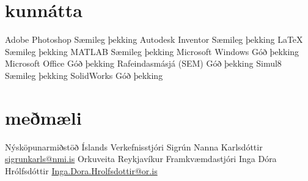 \documentclass[]{friggeri-cv}
\begin{document}

\section{kunnátta}

\begin{entrylist}
  \entry
    {Adobe Photoshop}
    {Sæmileg þekking}
    {}
    {}
  \entry
    {Autodesk Inventor}
    {Sæmileg þekking}
    {}
    {}
  \entry
    {\LaTeX}
    {Sæmileg þekking}
    {}
    {}
  \entry
    {MATLAB}
    {Sæmileg þekking}
    {}
    {}
  \entry
    {Microsoft Windows}
    {Góð þekking}
    {}
    {}
  \entry
    {Microsoft Office}
    {Góð þekking}
    {}
    {}
  \entry
    {Rafeindasmásjá (SEM)}
    {Góð þekking}
    {}
    {}
  \entry
    {Simul8}
    {Sæmileg þekking}
    {}
    {}
  \entry
    {SolidWorks}
    {Góð þekking}
    {}
    {}
\end{entrylist}

\newpage

\section{meðmæli}


\begin{entrylist}
  \entryy
    {Nýsköpunarmiðstöð Íslands}
    {Verkefnisstjóri}
    {Sigrún Nanna Karlsdóttir}
    {\href{mailto:sigrunkarls@nmi.is}{sigrunkarls@nmi.is}}
  \entryy
    {Orkuveita Reykjavíkur}
    {Framkvæmdastjóri}
    {Inga Dóra Hrólfsdóttir}
    {\href{mailto:Inga.Dora.Hrolfsdottir@or.is}{Inga.Dora.Hrolfsdottir@or.is}}
\end{entrylist}
\end{document}
